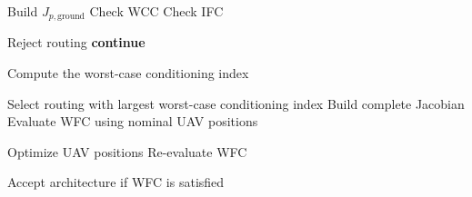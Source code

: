 \begin{algorithm}[h]
\caption{Architecture Selection Strategy}
\label{alg:cable_optimization}
\begin{algorithmic}[1]

            \State Build $J_{p,\mathrm{ground}}$
            \State Check WCC 
            \State Check IFC 

                \State Reject routing
                \State \textbf{continue}
            \EndIf

        \EndFor
        \State Compute the worst-case conditioning index
    \EndFor

    \State Select routing with largest worst-case conditioning index
    \State Build complete Jacobian 
    \State Evaluate WFC using nominal UAV positions 

        \State Optimize UAV positions
        \State Re-evaluate WFC
    \EndIf

    \State Accept architecture if WFC is satisfied

\EndFor

\end{algorithmic}
\end{algorithm}